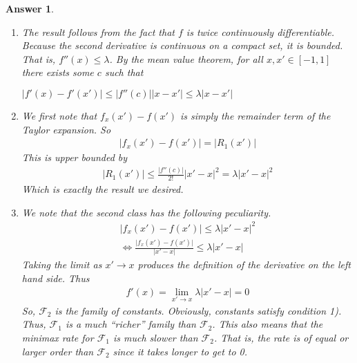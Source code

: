 \documentclass[12pt]{article}
\theoremstyle{colon}
\newtheorem*{answer}{Answer}
\begin{document}
\begin{answer}
  \leavevmode
  \begin{enumerate}[label=\arabic*)]
    \item The result follows from the fact that $f$ is twice continuously differentiable. Because the second derivative is continuous on a compact set, it is bounded. That is, $f''(x) \leq \lambda$. By the mean value theorem, for all $x,x' \in [-1,1]$ there exists some $c$ such that
      \begin{center}
        $\lvert f'(x) - f'(x') \rvert \leq \lvert f''(c) \rvert \lvert x - x' \rvert \leq \lambda \lvert x - x' \rvert$
      \end{center}

    \item We first note that $f_x(x') - f(x')$ is simply the remainder term of the Taylor expansion. So
      \begin{gather*}
        \lvert f_x(x') - f(x') \rvert = \lvert R_1(x') \rvert
      \end{gather*}
      This is upper bounded by
      \begin{gather*}
         \lvert R_1(x') \rvert \leq \frac{\lvert f''(c) \rvert}{2!} \lvert x' - x \rvert^2 = \lambda \lvert x' - x \rvert^2
      \end{gather*}
      Which is exactly the result we desired.

    \item We note that the second class has the following peculiarity.
      \begin{gather*}
        \lvert f_x(x') - f(x') \rvert \leq \lambda \lvert x' - x \rvert^2 \\
        \Leftrightarrow \frac{\lvert f_x(x') - f(x') \rvert}{\lvert x' - x \rvert} \leq \lambda \lvert x' - x \rvert
      \end{gather*}
      Taking the limit as $x' \rightarrow x$ produces the definition of the derivative on the left hand side. Thus
      \begin{gather*}
        f'(x) = \lim_{x' \rightarrow x} \lambda \lvert x' - x \rvert = 0
      \end{gather*}
      So, $\mathcal{F}_2$ is the family of constants. Obviously, constants satisfy condition 1). Thus, $\mathcal{F}_1$ is a much ``richer'' family than $\mathcal{F}_2$. This also means that the minimax rate for $\mathcal{F}_1$ is much slower than $\mathcal{F}_2$. That is, the rate is of equal or larger order than $\mathcal{F}_2$ since it takes longer to get to 0.
  \end{enumerate}
\end{answer}
\end{document}
